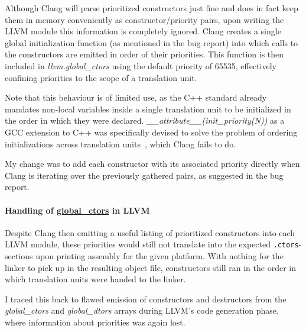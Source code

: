 Although Clang will parse prioritized constructors just fine and does in fact
keep them in memory conveniently as constructor/priority pairs, upon writing
the LLVM module this information is completely ignored. Clang creates a single
global initialization function (as mentioned in the bug report) into which
calls to the constructors are emitted in order of their priorities. This
function is then included in \emph{llvm.global\_ctors} using the default
priority of 65535, effectively confining priorities to the scope of
a translation unit.

\begin{framed}

Note that this behaviour is of limited use, as the C++ standard already
mandates non-local variables inside a single translation unit to be initialized
in the order in which they were declared.
\emph{\_\_attribute\_\_(init\_priority(N))} as a GCC extension to C++ was
specifically devised to solve the problem of ordering initializations across
translation units~\cite{gcc-initpriority}, which Clang fails to do.


\end{framed}

My change was to add each constructor with its associated priority directly
when Clang is iterating over the previously gathered pairs, as suggested in the
bug report.


\paragraph{Handling of \url{global\_ctors} in LLVM}

Despite Clang then emitting a useful listing of prioritized constructors into
each LLVM module, these priorities would still not translate into the expected
\texttt{.ctors}-sections upon printing assembly for the given platform.  With
nothing for the linker to pick up in the
resulting object file, constructors still ran in the order in which translation
units were handed to the linker.

I traced this back to flawed emission of constructors and destructors from the
\emph{global\_ctors} and \emph{global\_dtors} arrays during LLVM's code
generation phase, where information about priorities was again lost.

